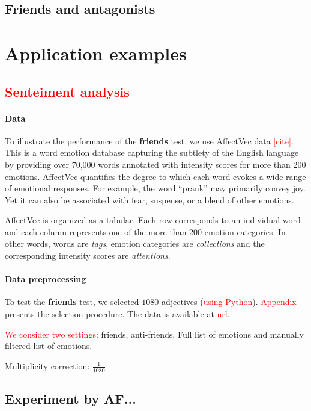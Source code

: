 \documentclass{llncs}
\newcommand{\red}[1]{\textcolor{red}{#1}}
\begin{document}
\subsection{Friends and antagonists}





\section{Application examples}
\label{sec:experiments}
\subsection{\red{Senteiment analysis}}
\paragraph{Data} To illustrate the performance of the 
\textbf{friends} test, we use AffectVec data \red{[cite]}. This is a word emotion database capturing the subtlety of the English language by providing over 70,000 words annotated with intensity scores for more than 200 emotions. AffectVec quantifies the degree to which each word evokes a wide range of emotional responses. For example, the word ``prank'' may primarily convey joy. Yet it can also be associated with fear, suspense, or a blend of other emotions.

AffectVec is organized as a tabular. Each row corresponds to an individual word and each column represents one of the more than 200 emotion categories. In other words, words are \textit{tags}, emotion categories are \textit{collections} and the corresponding intensity scores are \textit{attentions}. 

\paragraph{Data preprocessing} To test the \textbf{friends} test, we selected $1080$ adjectives (\red{using Python}). \red{Appendix} presents the selection procedure. The data is available at \red{url}.

\red{We consider two settings}: friends, anti-friends. Full list of emotions and manually filtered list of emotions.

Multiplicity correction: $\frac{1}{1080}$

\subsection{Experiment by AF...}
\end{document}
